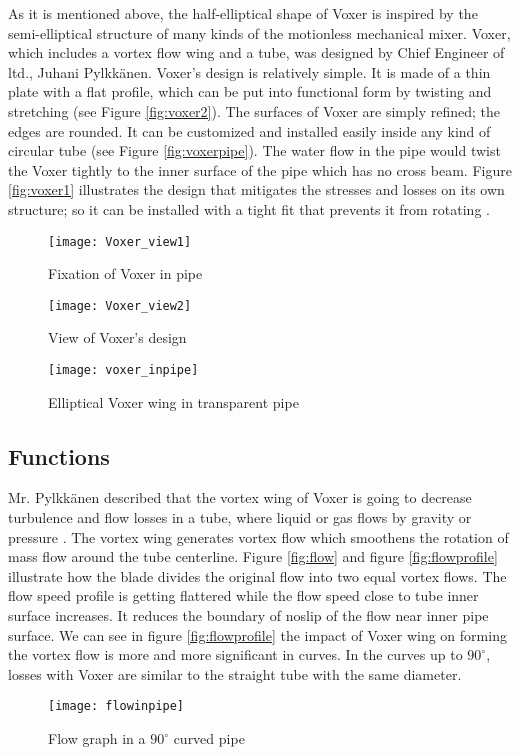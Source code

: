 As it is mentioned above, the half-elliptical shape of Voxer is inspired by the semi-elliptical structure of many kinds of the motionless mechanical mixer. Voxer, which includes a vortex flow wing and a tube, was designed by Chief Engineer of \gls{ltd}., Juhani Pylkkänen. Voxer's design is relatively simple. It is made of a thin plate with a flat profile, which can be put into functional form by twisting and stretching (see Figure \vref{fig:voxer2}). The surfaces of Voxer are simply refined; the edges are rounded. It can be customized and installed easily inside any kind of circular tube (see Figure \vref{fig:voxerpipe}). The water flow in the pipe would twist the Voxer tightly to the inner surface of the pipe which has no cross beam. Figure \vref{fig:voxer1} illustrates the design that mitigates the stresses and losses on its own structure; so it can be installed with a tight fit that prevents it from rotating \cite{voxer:article}.

\begin{figure}[h]
  \centering
  \texttt{[image: Voxer\_view1]}
  \caption{ Fixation of Voxer in pipe \cite{voxer:article}}
  \label{fig:voxer1}
\end{figure}

\begin{figure}[h]
  \centering
  \texttt{[image: Voxer\_view2]}
  \caption{ View of Voxer's design \cite{voxer:article}}
  \label{fig:voxer2}
\end{figure}

\begin{figure}[h]
  \centering
  \texttt{[image: voxer\_inpipe]}
  \caption{ Elliptical Voxer wing in transparent pipe}
  \label{fig:voxerpipe}
\end{figure}

\subsection{Functions}

Mr. Pylkkänen described that the vortex wing of Voxer is going to decrease turbulence and flow losses in a tube, where liquid or gas flows by gravity or pressure \cite{voxer:article}. The vortex wing generates vortex flow which smoothens the rotation of mass flow around the tube centerline. Figure \vref{fig:flow} and figure \vref{fig:flowprofile} illustrate how the blade divides the original flow into two equal vortex flows. The flow speed profile is getting flattered while the flow speed close to tube inner surface increases. It reduces the boundary of \gls{noslip} of the flow near inner pipe surface. We can see in figure \vref{fig:flowprofile} the impact of Voxer wing on forming the vortex flow is more and more significant in curves. In the curves up to $90^{\circ}$, losses with Voxer are similar to the straight tube with the same diameter. 
\newpage
\begin{figure}[h!]
  \centering
  \texttt{[image: flowinpipe]}
  \caption{ Flow graph in a $90^{\circ}$ curved pipe \cite{voxer:article}}
  \label{fig:flow}
\end{figure}

